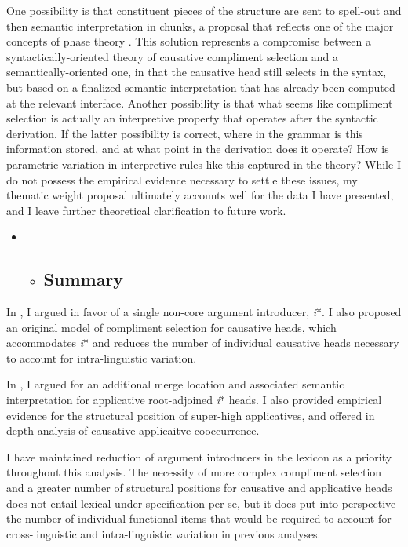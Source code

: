 \documentclass[output=paper,modfonts,nonflat]{langsci/langscibook}
\begin{document}
One possibility is that constituent pieces of the structure are sent to spell-out and then semantic interpretation in chunks, a proposal that reflects one of the major concepts of phase theory \citep{Chomsky1999}. This solution represents a compromise between a syntactically-oriented theory of causative compliment selection and a semantically-oriented one, in that the causative head still selects in the syntax, but based on a finalized semantic interpretation that has already been computed at the relevant interface. Another possibility is that what seems like compliment selection is actually an interpretive property that operates after the syntactic derivation. If the latter possibility is correct, where in the grammar is this information stored, and at what point in the derivation does it operate? How is parametric variation in interpretive rules like this captured in the theory? While I do not possess the empirical evidence necessary to settle these issues, my thematic weight proposal ultimately accounts well for the data I have presented, and I leave further theoretical clarification to future work. 


\begin{itemize}
\item \begin{itemize}
\item \subsection{Summary}
\end{itemize}
\end{itemize}

In , I argued in favor of a single non-core argument introducer, \textit{i}*. I also proposed an original model of compliment selection for causative heads, which accommodates \textit{i}* and reduces the number of individual causative heads necessary to account for intra-linguistic variation. 

In , I argued for an additional merge location and associated semantic interpretation for applicative root-adjoined \textit{i}* heads. I also provided empirical evidence for the structural position of super-high applicatives, and offered in depth analysis of causative-applicaitve cooccurrence. 

I have maintained reduction of argument introducers in the lexicon as a priority throughout this analysis. The necessity of more complex compliment selection and a greater number of structural positions for causative and applicative heads does not entail lexical under-specification per se, but it does put into perspective the number of individual functional items that would be required to account for cross-linguistic and intra-linguistic variation in previous analyses. 
\end{document}
